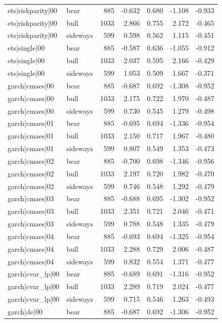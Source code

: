 \begin{table}
\begin{tabular}{llrrrrr}
ets|riskparity|00 & bear & 885 & -0.632 & 0.680 & -1.108 & -0.933 \\
ets|riskparity|00 & bull & 1033 & 2.866 & 0.755 & 2.172 & -0.465 \\
ets|riskparity|00 & sideways & 599 & 0.598 & 0.562 & 1.115 & -0.451 \\
ets|single|00 & bear & 885 & -0.587 & 0.636 & -1.055 & -0.912 \\
ets|single|00 & bull & 1033 & 2.037 & 0.595 & 2.166 & -0.429 \\
ets|single|00 & sideways & 599 & 1.053 & 0.509 & 1.667 & -0.371 \\
garch|cmaes|00 & bear & 885 & -0.687 & 0.692 & -1.308 & -0.952 \\
garch|cmaes|00 & bull & 1033 & 2.175 & 0.722 & 1.970 & -0.487 \\
garch|cmaes|00 & sideways & 599 & 0.730 & 0.545 & 1.279 & -0.498 \\
garch|cmaes|01 & bear & 885 & -0.695 & 0.694 & -1.336 & -0.954 \\
garch|cmaes|01 & bull & 1033 & 2.150 & 0.717 & 1.967 & -0.480 \\
garch|cmaes|01 & sideways & 599 & 0.807 & 0.549 & 1.353 & -0.473 \\
garch|cmaes|02 & bear & 885 & -0.700 & 0.698 & -1.346 & -0.956 \\
garch|cmaes|02 & bull & 1033 & 2.197 & 0.720 & 1.982 & -0.470 \\
garch|cmaes|02 & sideways & 599 & 0.746 & 0.548 & 1.292 & -0.479 \\
garch|cmaes|03 & bear & 885 & -0.688 & 0.695 & -1.302 & -0.952 \\
garch|cmaes|03 & bull & 1033 & 2.351 & 0.721 & 2.046 & -0.471 \\
garch|cmaes|03 & sideways & 599 & 0.788 & 0.548 & 1.335 & -0.479 \\
garch|cmaes|04 & bear & 885 & -0.693 & 0.694 & -1.325 & -0.954 \\
garch|cmaes|04 & bull & 1033 & 2.288 & 0.729 & 2.006 & -0.487 \\
garch|cmaes|04 & sideways & 599 & 0.832 & 0.554 & 1.371 & -0.477 \\
garch|cvar\_lp|00 & bear & 885 & -0.689 & 0.691 & -1.316 & -0.952 \\
garch|cvar\_lp|00 & bull & 1033 & 2.289 & 0.719 & 2.024 & -0.477 \\
garch|cvar\_lp|00 & sideways & 599 & 0.715 & 0.546 & 1.263 & -0.493 \\
garch|de|00 & bear & 885 & -0.687 & 0.692 & -1.306 & -0.952 \\

\end{tabular}
\end{table}
